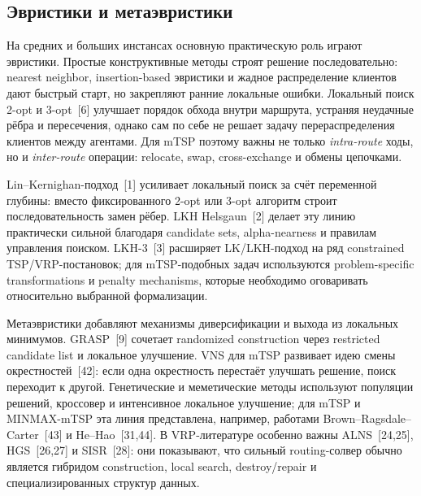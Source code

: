 \documentclass[14pt,a4paper]{extarticle}
\newcommand{\source}[1]{[#1]}
\begin{document}
\subsection{Эвристики и метаэвристики}

На средних и больших инстансах основную практическую роль играют эвристики. Простые конструктивные методы строят решение последовательно: nearest neighbor, insertion-based эвристики и жадное распределение клиентов дают быстрый старт, но закрепляют ранние локальные ошибки. Локальный поиск 2-opt и 3-opt~\source{6} улучшает порядок обхода внутри маршрута, устраняя неудачные рёбра и пересечения, однако сам по себе не решает задачу перераспределения клиентов между агентами. Для mTSP поэтому важны не только \textit{intra-route} ходы, но и \textit{inter-route} операции: relocate, swap, cross-exchange и обмены цепочками.

Lin--Kernighan-подход~\source{1} усиливает локальный поиск за счёт переменной глубины: вместо фиксированного 2-opt или 3-opt алгоритм строит последовательность замен рёбер. LKH Helsgaun~\source{2} делает эту линию практически сильной благодаря candidate sets, alpha-nearness и правилам управления поиском. LKH-3~\source{3} расширяет LK/LKH-подход на ряд constrained TSP/VRP-постановок; для mTSP-подобных задач используются problem-specific transformations и penalty mechanisms, которые необходимо оговаривать относительно выбранной формализации.

Метаэвристики добавляют механизмы диверсификации и выхода из локальных минимумов. GRASP~\source{9} сочетает randomized construction через restricted candidate list и локальное улучшение. VNS для mTSP развивает идею смены окрестностей~\source{42}: если одна окрестность перестаёт улучшать решение, поиск переходит к другой. Генетические и меметические методы используют популяции решений, кроссовер и интенсивное локальное улучшение; для mTSP и MINMAX-mTSP эта линия представлена, например, работами Brown--Ragsdale--Carter~\source{43} и He--Hao~\source{31,44}. В VRP-литературе особенно важны ALNS~\source{24,25}, HGS~\source{26,27} и SISR~\source{28}: они показывают, что сильный routing-солвер обычно является гибридом construction, local search, destroy/repair и специализированных структур данных.
\end{document}
